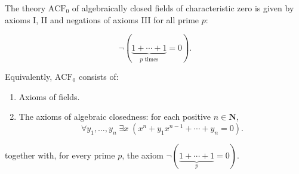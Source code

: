 The theory $\text{ACF}_0$ of algebraically closed fields of characteristic zero is given by axioms I, II and negations of axioms III for all prime $p$:

$$\neg\left(\underbrace{1 + \cdots + 1}_{p \text{ times}} = 0\right).$$

Equivalently, $\text{ACF}_0$ consists of:
\begin{enumerate}
\item[I.] Axioms of fields.
\item[II.] The axioms of algebraic closedness: for each positive $n \in \mathbf{N}$,
$$\forall y_1, \ldots, y_n \; \exists x \; (x^n + y_1 x^{n-1} + \cdots + y_n = 0).$$
\end{enumerate}
together with, for every prime $p$, the axiom $\neg(\underbrace{1 + \cdots + 1}_{p} = 0)$.
